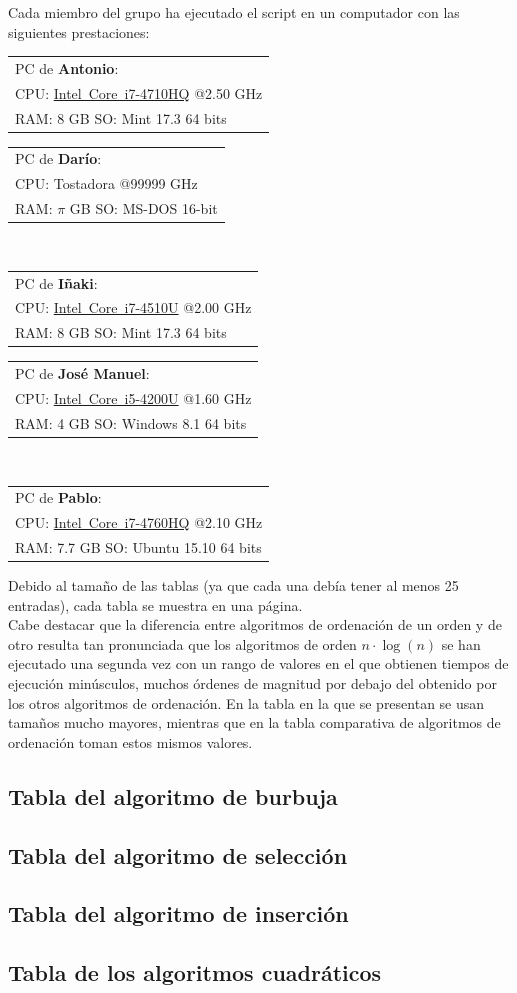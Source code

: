 \documentclass[a4paper, 11pt]{article}
\makeatletter
\newcommand{\spec}[5]{
\bgroup
\def\arraystretch{1.2}
\begin{tabular}{|l|}
\hline
PC de \textbf{#1}:\\
CPU: #2 @#3 GHz\\RAM: #4 GB \hspace{0.8cm} SO: #5 \\
\hline
\end{tabular}
\egroup
\vspace*{0.2cm}
}
\makeatother
\begin{document}
Cada miembro del grupo ha ejecutado el script en un computador con las siguientes prestaciones:

\noindent
\spec{Antonio}{\href{http://ark.intel.com/products/78930}{Intel\textregistered\ Core\texttrademark\ i7-4710HQ}}{2.50}{8}{Mint 17.3 64 bits}
\spec{Darío}{Tostadora}{99999}{$\pi$}{MS-DOS 16-bit} \\
\spec{Iñaki}{\href{http://ark.intel.com/products/81015}{Intel\textregistered\ Core\texttrademark\ i7-4510U}}{2.00}{8}{Mint 17.3 64 bits}
\spec{José Manuel}{\href{http://ark.intel.com/es-es/products/75459/}{Intel\textregistered\ Core\texttrademark\ i5-4200U}}{1.60}{4}{Windows 8.1 64 bits} \\
\spec{Pablo}{\href{http://ark.intel.com/es-es/products/76090/}{Intel\textregistered\ Core\texttrademark\ i7-4760HQ}}{2.10}{7.7}{Ubuntu 15.10 64 bits}

Debido al tamaño de las tablas (ya que cada una debía tener al menos 25 entradas),
cada tabla se muestra en una página. \\

Cabe destacar que la diferencia entre algoritmos de ordenación de un orden y de
otro resulta tan pronunciada que los algoritmos de orden $n \cdot \log (n)$ se
han ejecutado una segunda vez con un rango de valores en el que obtienen tiempos
de ejecución minúsculos, muchos órdenes de magnitud por debajo del obtenido por
los otros algoritmos de ordenación. En la tabla en la que se presentan se usan
tamaños mucho mayores, mientras que en la tabla comparativa de algoritmos de
ordenación toman estos mismos valores.

\subsection{Tabla del algoritmo de burbuja}


\subsection{Tabla del algoritmo de selección}


\subsection{Tabla del algoritmo de inserción}


\newpage
\subsection{Tabla de los algoritmos cuadráticos}
\end{document}
